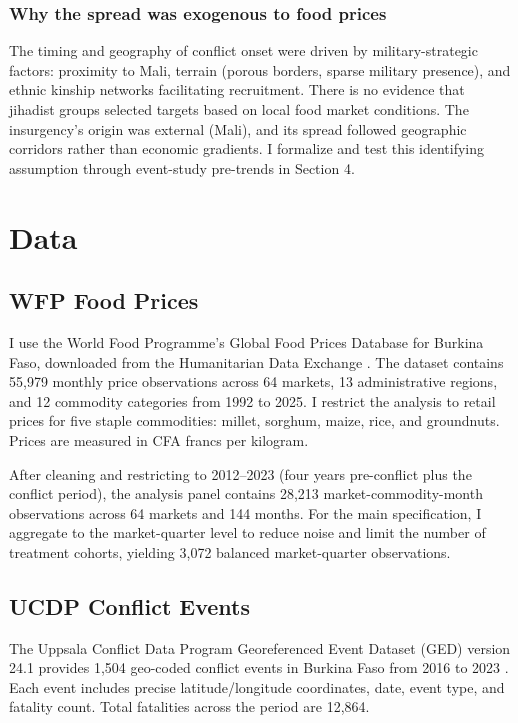 \documentclass[12pt]{article}
\begin{document}
\subsubsection*{Why the spread was exogenous to food prices} The timing and geography of conflict onset were driven by military-strategic factors: proximity to Mali, terrain (porous borders, sparse military presence), and ethnic kinship networks facilitating recruitment. There is no evidence that jihadist groups selected targets based on local food market conditions. The insurgency's origin was external (Mali), and its spread followed geographic corridors rather than economic gradients. I formalize and test this identifying assumption through event-study pre-trends in Section 4.


\section{Data}

\subsection{WFP Food Prices}

I use the World Food Programme's Global Food Prices Database for Burkina Faso, downloaded from the Humanitarian Data Exchange \citep{wfp2024}. The dataset contains 55,979 monthly price observations across 64 markets, 13 administrative regions, and 12 commodity categories from 1992 to 2025. I restrict the analysis to retail prices for five staple commodities: millet, sorghum, maize, rice, and groundnuts. Prices are measured in CFA francs per kilogram.

After cleaning and restricting to 2012--2023 (four years pre-conflict plus the conflict period), the analysis panel contains 28,213 market-commodity-month observations across 64 markets and 144 months. For the main specification, I aggregate to the market-quarter level to reduce noise and limit the number of treatment cohorts, yielding 3,072 balanced market-quarter observations.

\subsection{UCDP Conflict Events}

The Uppsala Conflict Data Program Georeferenced Event Dataset (GED) version 24.1 provides 1,504 geo-coded conflict events in Burkina Faso from 2016 to 2023 \citep{ucdp2024}. Each event includes precise latitude/longitude coordinates, date, event type, and fatality count. Total fatalities across the period are 12,864.
\end{document}
